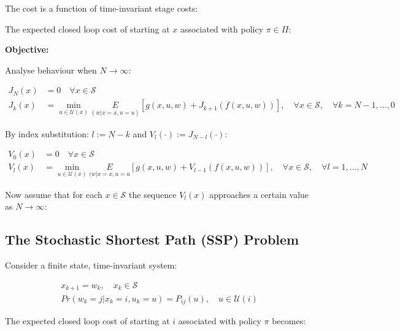 \documentclass[10pt,a4paper]{scrartcl}
\begin{document}
\begin{multicols*}{2}
The cost is a function of time-invariant stage costs:


The expected closed loop cost of starting at $x$ associated with policy $\pi\in\Pi$:


\textbf{Objective:}


Analyse behaviour when $N\rightarrow\infty$:

\begin{align*}
J_N(x)&=0\quad \forall x\in\mathcal{S}\\
J_k(x)&=\underset{u\in\mathcal{U}(x)}{\min}\underset{(w|x=x,u=u)}{E}[g(x,u,w)+J_{k+1}(f(x,u,w))],\quad \forall x\in\mathcal{S},\quad \forall k=N-1,\ldots,0
\end{align*}

By index substitution: $l:=N-k$ and $V_l(\cdot):=J_{N-l}(\cdot)$:

\begin{align*}
V_0(x)&=0\quad \forall x\in\mathcal{S}\\
V_l(x)&=\underset{u\in\mathcal{U}(x)}{\min}\underset{(w|x=x,u=u}{E}[g(x,u,w)+V_{l-1}(f(x,u,w))],\quad\forall x\in\mathcal{S},\quad\forall l=1,\ldots,N
\end{align*}

Now assume that for each $x\in\mathcal{S}$ the sequence $V_l(x)$ approaches a certain value as $N\rightarrow\infty$:


\subsection{The Stochastic Shortest Path (SSP) Problem}

Consider a finite state, time-invariant system:

\begin{align*}
x_{k+1}=w_k,\quad x_k\in\mathcal{S}\\
Pr(w_k=j|x_k=i,u_k=u)=P_{ij}(u),\quad u\in\mathcal{U}(i)
\end{align*}

The expected closed loop cost of starting at $i$ associated with policy $\pi$ becomes:


\end{multicols*}
\end{document}
